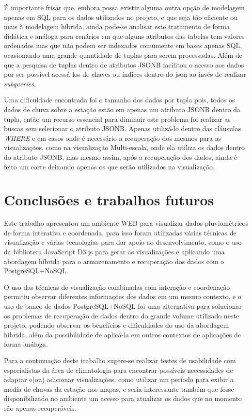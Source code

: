 \documentclass[article,11pt,oneside,a4paper]{abntex2} %
\begin{document}
	É importante frisar que, embora possa existir alguma outra opção de modelagem apenas em SQL para os dados utilizados no projeto, e que seja tão eficiente ou mais à modelagem híbrida, ainda pode-se analisar este tratamento de forma didática e análoga para cenários em que alguns atributos das tabelas tem valores ordenados mas que não podem ser indexados comumente em bases apenas SQL, ocasionando uma grande quantidade de tuplas para serem processadas. Além de que a pesquisa de tuplas dentro de atributos JSONB facilitou o acesso aos dados por ser possível acessá-los de chaves ou índices dentro do json ao invés de realizar \textit{subqueries}.
	
	Uma dificuldade encontrada foi o tamanho dos dados por tupla pois, todos os dados de chuva sobre a estação estão em apenas um atributo JSONB dentro da tupla, então um recurso essencial para diminuir este problema foi realizar as buscas sem selecionar o atributo JSONB. Apenas utilizá-lo dentro das cláusulas \textit{WHERE} e em casos onde é necessário a recuperação dos mesmos para as visualizações, como na visualização Multi-escala, onde ela utiliza os dados dentro do atributo JSONB, mas mesmo assim, após a recuperação dos dados, ainda é feito um corte deixando apenas os que serão utilizados na visualização.
	
	\section{Conclusões e trabalhos futuros}
		\hspace{13pt}
	Este trabalho apresentou um ambiente WEB para visualizar dados pluviométricos de forma interativa e coordenada, para isso foram utilizadas várias técnicas de visualização e várias tecnologias para dar apoio ao desenvolvimento, como o uso da biblioteca JavaScript D3.js para gerar as visualizações e aplicando uma abordagem híbrida para o armazenamento e recuperação dos dados com o PostgreSQL+NoSQL.
	
	O uso das técnicas de visualização combinadas com interação e coordenação permitiu observar diferentes informações dos dados em um mesmo contexto, e o uso de banco de dados PostgreSQL+NoSQL foi uma alternativa para solucionar os problemas de recuperação de dados dentro do grande volume utilizado neste projeto, podendo observar os benefícios e dificuldades do uso da abordagem híbrida, além da possibilidade de aplicá-la em outros contextos de aplicações de forma análoga.

	Para a continuação deste trabalho sugere-se realizar testes de usabilidade com especialistas da área de climatologia para encontrar possíveis necessidades de adaptar e(ou) adicionar visualizações, como utilizar um período para exibir a media de chuvas da estação nos mapas, e seria interessante também que fosse disponibilizado no ambiente um acesso para atualizar os dados que no momento são apenas recuperáveis.


	 
\end{document}
